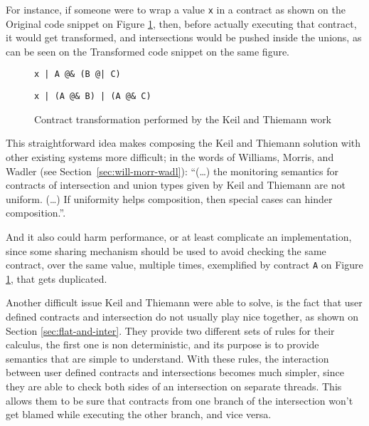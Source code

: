 \documentclass[sigplan,10pt,review,anonymous]{acmart}
\newcommand{\unsure}[2][1=]{}
\newcommand{\info}[2][1=]{}
\newcommand{\nickel}[1]{\lstinline[language=nickel]{#1}}
\begin{document}
For instance, if someone were to wrap a value \nickel{x}
in a contract as shown on the Original code snippet on Figure
\ref{fig:kt-contract-transf}, then, before actually executing that
contract, it would get transformed, and intersections would
be pushed inside the unions, as can be seen on the Transformed
code snippet on the same figure.

\begin{figure}[h]
\begin{lstlisting}[language=nickel, title=Original]
x | A @& (B @| C)
\end{lstlisting}
\begin{lstlisting}[language=nickel, title=Transformed]
x | (A @& B) | (A @& C)
\end{lstlisting}
\caption{Contract transformation performed by the Keil and
Thiemann work}
\label{fig:kt-contract-transf}
\end{figure}

This straightforward idea makes composing the Keil and Thiemann
solution with other existing systems more difficult; in the words
of Williams, Morris, and Wadler (see Section~\ref{sec:will-morr-wadl}):
``(\ldots) the monitoring semantics for contracts of intersection and union types given by Keil
and Thiemann are not uniform. (\ldots) If uniformity helps composition, then
special cases can hinder composition.''\cite{RootCauseOfBlame}.
\info{(Yann) Does
it also make it less efficient? If $(A \cap B)$ fails because of $B$, their
development causes to recheck the contract $A$ that has been duplicated?}
And it also could harm performance, or at least complicate an implementation,
since some sharing mechanism should be used to avoid checking the same contract,
over the same value, multiple times, exemplified by contract \nickel{A} on
Figure \ref{fig:kt-contract-transf}, that gets duplicated.
\unsure{Arnaud says: this whole
section is too abstract give concrete code and explain what goes
wrong. It's fine to give code in Nickel syntax}

Another difficult issue Keil and Thiemann were able to solve, is the
fact that user defined contracts and intersection do not usually play nice
together, as shown on Section \ref{sec:flat-and-inter}.
They provide two different sets of rules for their calculus,
the first one is non deterministic, and its purpose is to provide
semantics that are simple to understand.
With these rules, the interaction between user defined contracts and
intersections becomes much simpler, since they are able to check
both sides of an intersection on separate threads.
This allows them to be sure that contracts from one branch of the intersection
won't get blamed while executing the other branch, and vice versa.
\end{document}
